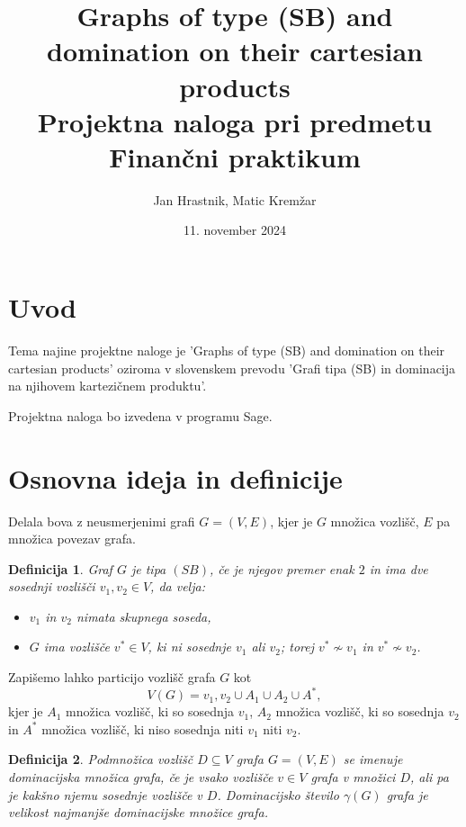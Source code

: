 \documentclass{article}
\begin{document}
\newtheorem{definition}{Definicija}


\title{Graphs of type (SB) and domination on their cartesian products\\ 
\large Projektna naloga pri predmetu Finančni praktikum }
\author{Jan Hrastnik, Matic Kremžar}
\date{11. november 2024}
\maketitle

\section{Uvod}
Tema najine projektne naloge je 'Graphs of type (SB) and domination on their cartesian products' oziroma v slovenskem prevodu
'Grafi tipa (SB) in dominacija na njihovem kartezičnem produktu'.

Projektna naloga bo izvedena v programu Sage.

\section{Osnovna ideja in definicije}
Delala bova z neusmerjenimi grafi $G = (V,E)$, kjer je $G$ množica vozlišč, $E$ 
pa množica povezav grafa.

\begin{definition}
    Graf $G$ je tipa $(SB)$, če je njegov premer enak $2$ in ima dve sosednji vozlišči $v_1, v_2\in V$, da velja:
    \begin{itemize}
        \item $v_1$ in $v_2$ nimata skupnega soseda,
        \item $G$ ima vozlišče $v^*\in V$, ki ni sosednje $v_1$ ali $v_2$; torej $v^*\not\sim v_1$ in $v^*\not\sim v_2$. \newline
    \end{itemize}
\end{definition} 

Zapišemo lahko particijo vozlišč grafa $G$ kot $$V(G) = {v_1, v_2} \cup A_1 \cup A_2 \cup A^*,$$
kjer je $A_1$ množica vozlišč, ki so sosednja $v_1$, $A_2$ množica vozlišč, ki so sosednja $v_2$ in 
$A^*$ množica vozlišč, ki niso sosednja niti $v_1$ niti $v_2$.

\begin{definition}
   Podmnožica vozlišč $D\subseteq V$ grafa $G=(V,E)$ se imenuje \emph{dominacijska množica} grafa,
   če je vsako vozlišče $v\in V$ grafa v množici $D$, ali pa je kakšno njemu sosednje vozlišče
   v $D$. \emph{Dominacijsko število $\gamma(G)$} grafa je velikost najmanjše dominacijske
   množice grafa.
\end{definition}
\end{document}
